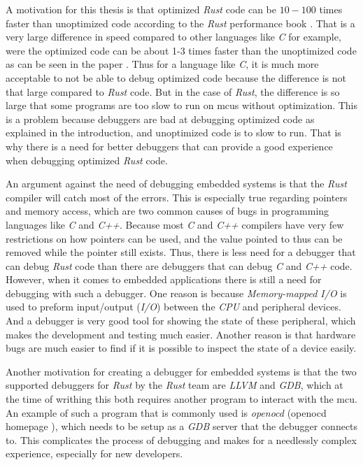 A motivation for this thesis is that optimized \emph{Rust} code can be $10-100$ times faster than unoptimized code according to the \emph{Rust} performance book \cite{perf-book}.
That is a very large difference in speed compared to other languages like \emph{C} for example, were the optimized code can be about 1-3 times faster than the unoptimized code as can be seen in the paper \cite{clang-opt}.
Thus for a language like \emph{C}, it is much more acceptable to not be able to debug optimized code because the difference is not that large compared to \emph{Rust} code.
But in the case of \emph{Rust}, the difference is so large that some programs are too slow to run on \glspl{mcu} without optimization.
This is a problem because debuggers are bad at debugging optimized code as explained in the introduction, and unoptimized code is to slow to run.
That is why there is a need for better debuggers that can provide a good experience when debugging optimized \emph{Rust} code.


An argument against the need of debugging embedded systems is that the \emph{Rust} compiler will catch most of the errors.
This is especially true regarding pointers and memory access, which are two common causes of bugs in programming languages like \emph{C} and \emph{C++}.
Because most \emph{C} and \emph{C++} compilers have very few restrictions on how pointers can be used, and the value pointed to thus can be removed while the pointer still exists. 
Thus, there is less need for a debugger that can debug \emph{Rust} code than there are debuggers that can debug \emph{C} and \emph{C++} code.
However, when it comes to embedded applications there is still a need for debugging with such a debugger.
One reason is because \emph{Memory-mapped I/O} is used to preform input/output (\emph{I/O}) between the \emph{CPU} and peripheral devices.
And a debugger is very good tool for showing the state of these peripheral, which makes the development and testing much easier.
Another reason is that hardware bugs are much easier to find if it is possible to inspect the state of a device easily.


Another motivation for creating a debugger for embedded systems is that the two supported debuggers for \emph{Rust} by the \emph{Rust} team are \emph{LLVM} and \emph{GDB}, which at the time of writhing this both requires another program to interact with the \gls{mcu}.
An example of such a program that is commonly used is \emph{openocd} (openocd homepage \cite{openocd}), which needs to be setup as a \emph{GDB} server that the debugger connects to.
This complicates the process of debugging and makes for a needlessly complex experience, especially for new developers.


